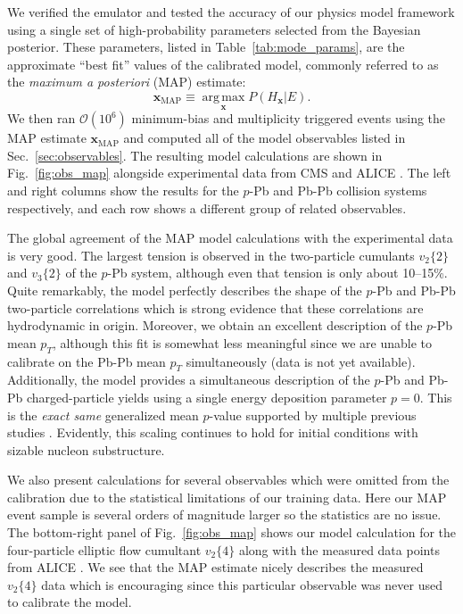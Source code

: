 \documentclass[aps,prc,reprint,amsmath,nofootinbib]{revtex4-1}
\newcommand{\vnk}[2]{v_#1\{#2\}}
\newcommand{\xv}{\mathbf x}
\newcommand{\order}[1]{$\mathcal O(10^{#1})$}
\begin{document}
We verified the emulator and tested the accuracy of our physics model framework using a single set of high-probability parameters selected from the Bayesian posterior.
These parameters, listed in Table~\ref{tab:mode_params}, are the approximate ``best fit'' values of the calibrated model, commonly referred to as the \emph{maximum a posteriori} (MAP) estimate:
\begin{equation}
  \xv_\mathrm{MAP} \equiv \operatorname*{arg\, max}_{\xv} P(H_\xv | E).
\end{equation}
We then ran \order{6} minimum-bias and multiplicity triggered events using the MAP estimate $\xv_\mathrm{MAP}$ and computed all of the model observables listed in Sec.~\ref{sec:observables}.
The resulting model calculations are shown in Fig.~\ref{fig:obs_map} alongside experimental data from CMS \cite{Chatrchyan:2013nka} and ALICE \cite{Adam:2015ptt, Adam:2016izf, Adam:2014qja, Abelev:2013bla}.
The left and right columns show the results for the $p$-Pb and Pb-Pb collision systems respectively, and each row shows a different group of related observables.

The global agreement of the MAP model calculations with the experimental data is very good.
The largest tension is observed in the two-particle cumulants $\vnk{2}{2}$ and $\vnk{3}{2}$ of the $p$-Pb system, although even that tension is only about 10--15\%.
Quite remarkably, the model perfectly describes the shape of the $p$-Pb and Pb-Pb two-particle correlations which is strong evidence that these correlations are hydrodynamic in origin.
Moreover, we obtain an excellent description of the \mbox{$p$-Pb} mean $p_T$, although this fit is somewhat less meaningful since we are unable to calibrate on the Pb-Pb mean $p_T$ simultaneously (data is not yet available).
Additionally, the model provides a simultaneous description of the \mbox{$p$-Pb} and Pb-Pb charged-particle yields using a single energy deposition parameter $p=0$.
This is the \emph{exact same} generalized mean $p$-value supported by multiple previous studies \cite{Moreland:2014oya, Bernhard:2016tnd, Ke:2016jrd, Bernhard:2018hnz}.
Evidently, this scaling continues to hold for initial conditions with sizable nucleon substructure.

We also present calculations for several observables which were omitted from the calibration due to the statistical limitations of our training data.
Here our MAP event sample is several orders of magnitude larger so the statistics are no issue.
The bottom-right panel of Fig.~\ref{fig:obs_map} shows our model calculation for the four-particle elliptic flow cumultant $\vnk{2}{4}$ along with the measured data points from \mbox{ALICE} \cite{Adam:2016izf}.
We see that the MAP estimate nicely describes the measured $\vnk{2}{4}$ data which is encouraging since this particular observable was never used to calibrate the model.
\end{document}
